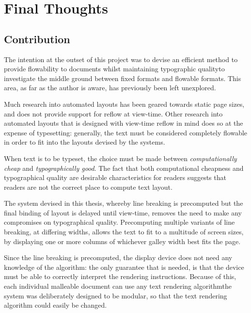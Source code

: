 \chapter{Final Thoughts}\label{ch:conclusions}


\section{Contribution}
The intention at the outset of this project was to devise an efficient method to provide flowability to documents whilst maintaining typographic quality\ed to investigate the middle ground between fixed formats and flowable formats. This area, as far as the author is aware, has previously been left unexplored.

Much research into automated layouts\hspace{0pt}\cite{Johari1996,Goldenberg2002,Purvis2003,Balinsky2009} has been geared towards static page sizes, and does not provide support for reflow at view-time. Other research into automated layouts that is designed with view-time reflow in mind\hspace{0pt}\cite{Jacobs2003,Schrier2008} does so at the expense of typesetting: generally, the text must be considered completely flowable in order to fit into the layouts devised by the systems.

When text is to be typeset, the choice must be made between \emph{computationally cheap} and \emph{typographically good}. The fact that both computational cheapness and typographical quality are desirable characteristics for \ebook{} readers suggests that \ebook{} readers are not the correct place to compute text layout.

The system devised in this thesis, whereby line breaking is precomputed but the final binding of layout is delayed until view-time, removes the need to make any compromises on typographical quality. Precomputing multiple variants of line breaking, at differing widths, allows the text to fit to a multitude of screen sizes, by displaying one or more columns of whichever galley width best fits the page.

Since the line breaking is precomputed, the display device does not need any knowledge of the algorithm: the only guarantee that is needed, is that the device must be able to correctly interpret the rendering instructions. Because of this, each individual malleable document can use any text rendering algorithm\ed the system was deliberately designed to be modular, so that the text rendering algorithm could easily be changed.

